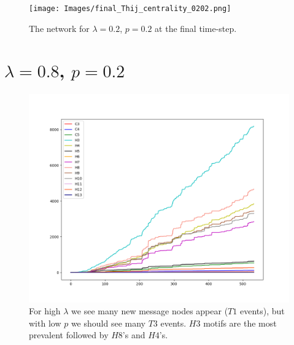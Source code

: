 \begin{figure}[h!]
    \texttt{[image: Images/final\_Thij\_centrality\_0202.png]}
    \centering
    \caption{The network for $\lambda=0.2$, $p=0.2$ at the final time-step.}
\end{figure}

\clearpage

\section{$\lambda=0.8$, $p=0.2$}

\begin{figure}[h!]
    \includegraphics[width=15cm]{Images/twitter_sim_for_stats_3_0.8_0.2.png}
    \centering
    \caption{For high $\lambda$ we see many new message nodes appear ($T1$ events), but
    with low $p$ we should see many $T3$ events. $H3$ motifs are the most prevalent
    followed by $H8$'s and $H4$'s.}
    \label{fig:thij0802}
\end{figure}

